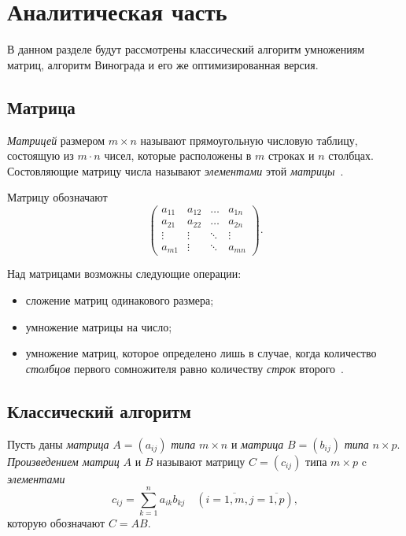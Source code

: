 \chapter{Аналитическая часть}
В данном разделе будут рассмотрены классический алгоритм умножениям матриц, алгоритм Винограда и его же оптимизированная версия.

\section{Матрица}
\textit{Матрицей} размером $m \times n$ называют прямоугольную числовую таблицу, состоящую из $m \cdot n$ чисел, которые расположены в $m$ строках и $n$ столбцах.
Состовляющие матрицу числа называют \textit{элементами} этой \textit{матрицы}~\cite{matrix}.

Матрицу обозначают
\begin{equation}
    \begin{pmatrix}
        a_{11} & a_{12} & \ldots & a_{1n}\\
		a_{21} & a_{22} & \ldots & a_{2n}\\
		\vdots & \vdots & \ddots & \vdots\\
        a_{m1} & \vdots & \ddots & a_{mn}
        \end{pmatrix}.
\end{equation}

Над матрицами возможны следующие операции:
\begin{itemize}
    \item сложение матриц одинакового размера;
    \item умножение матрицы на число;
    \item умножение матриц, которое определено лишь в случае, когда количество \textit{столбцов} первого сомножителя равно количеству \textit{строк} второго~\cite{matrix}.
\end{itemize}

\section{Классический алгоритм}
Пусть даны \textit{матрица} $A = (a_{ij})$ \textit{типа} $m \times n$ и \textit{матрица} $B = (b_{ij})$ \textit{типа} $n \times p$.
\textit{Произведением матриц} $A$ и $B$ называют матрицу $C = (c_{ij})$ типа $m \times p$ c \textit{элементами}
\begin{equation}
    \label{eq:classic_1}
    c_{ij} = \sum_{k=1}^{n}a_{ik}b_{kj} \quad (i = \overline{1, m}, j = \overline{1, p}),
\end{equation}
которую обозначают $C = AB$.

